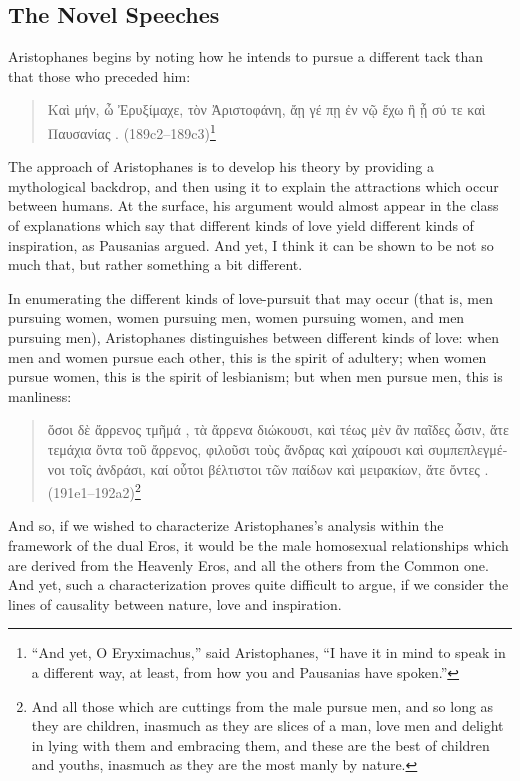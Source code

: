 \subsection*{The Novel Speeches}

Aristophanes begins by noting how he intends to pursue a different tack
than that those who preceded him:

\begin{quote}
\textgreek{Καὶ μήν, ὦ Ἐρυξίμαχε,  τὸν Ἀριστοφάνη,
ἄῃ γέ πῃ ἐν νῷ ἔχω  ἢ  ᾗ σύ τε καὶ Παυσανίας
.} (189c2--189c3)\footnote{``And yet, O Eryximachus,''
said Aristophanes, ``I have it in mind to speak in a different way, at
least, from how you and Pausanias have spoken.''}
\end{quote}

The approach of Aristophanes is to develop his theory by providing a
mythological backdrop, and then using it to explain the attractions
which occur between humans. At the surface, his argument would almost
appear in the class of explanations which say that different kinds of
love yield different kinds of inspiration, as Pausanias argued. And yet,
I think it can be shown to be not so much that, but rather something a
bit different.

In enumerating the different kinds of love-pursuit that may occur (that
is, men pursuing women, women pursuing men, women pursuing women, and
men pursuing men), Aristophanes distinguishes between different kinds of
love: when men and women pursue each other, this is the spirit of
adultery; when women pursue women, this is the spirit of lesbianism; but
when men pursue men, this is manliness:

\begin{quote}
\textgreek{ὅσοι δὲ ἄρρενος τμῆμά , τὰ ἄρρενα διώκουσι, καὶ
τέως μὲν ἂν παῖδες ὦσιν, ἅτε τεμάχια ὄντα τοῦ ἄρρενος, φιλοῦσι τοὺς
ἄνδρας καὶ χαίρουσι  καὶ συμπεπλεγμένοι τοῖς
ἀνδράσι, καί  οὗτοι βέλτιστοι τῶν παίδων καὶ μειρακίων,
ἅτε  ὄντες .}
(191e1--192a2)\footnote{And all those which are cuttings from the male
pursue men, and so long as they are children, inasmuch as they are
slices of a man, love men and delight in lying with them and embracing
them, and these are the best of children and youths, inasmuch as they
are the most manly by nature.}
\end{quote}

And so, if we wished to characterize Aristophanes's analysis within the
framework of the dual Eros, it would be the male homosexual
relationships which are derived from the Heavenly Eros, and all the
others from the Common one. And yet, such a characterization proves
quite difficult to argue, if we consider the lines of causality between
nature, love and inspiration.

